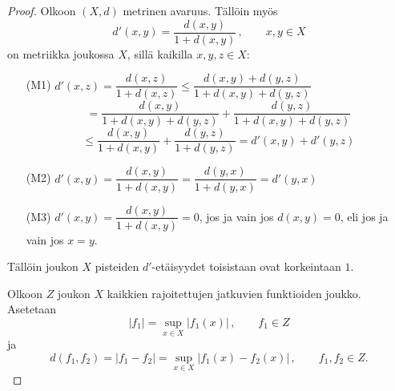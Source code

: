 \documentclass[12pt,a4paper,leqno]{report}
\theoremstyle{plain}
\theoremstyle{definition}
\theoremstyle{remark}
\begin{document}
\begin{proof} Olkoon $(X,d)$ metrinen avaruus. Tällöin myös
$$d'(x,y)=\dfrac{d(x,y)}{1+d(x,y)} \, , \qquad x,y\in X$$
on metriikka joukossa $X$, sillä kaikilla $x,y,z\in X$:
\begin{itemize}
\item[(M1)]$d'(x,z)=\dfrac{d(x,z)}{1+d(x,z)}\leq \dfrac{d(x,y)+d(y,z)}{1+d(x,y)+d(y,z)}$
$$= \dfrac{d(x,y)}{1+d(x,y)+d(y,z)}+ \dfrac{d(y,z)}{1+d(x,y)+d(y,z)}$$
$$\leq \dfrac{d(x,y)}{1+d(x,y)}+ \dfrac{d(y,z)}{1+d(y,z)}=d'(x,y)+d'(y,z)$$
\item[(M2)]$d'(x,y)=\dfrac{d(x,y)}{1+d(x,y)}=\dfrac{d(y,x)}{1+d(y,x)}=d'(y,x)$
\item[(M3)]$d'(x,y)=\dfrac{d(x,y)}{1+d(x,y)}=0$, jos ja vain jos $d(x,y)=0$, eli jos ja vain jos $x=y$.
\end{itemize} 
Tällöin joukon $X$ pisteiden $d'$-etäisyydet toisistaan ovat korkeintaan $1$.

Olkoon $Z$ joukon $X$ kaikkien rajoitettujen jatkuvien funktioiden joukko. Asetetaan
$$|f_1|=\sup_{x\in X} |f_1(x)| \, , \qquad f_1\in Z$$
ja
$$d(f_1,f_2)=|f_1-f_2| = \sup_{x\in X} |f_1 (x)-f_2 (x)| \, , \qquad f_1, f_2 \in Z .$$


\end{proof}
\end{document}
